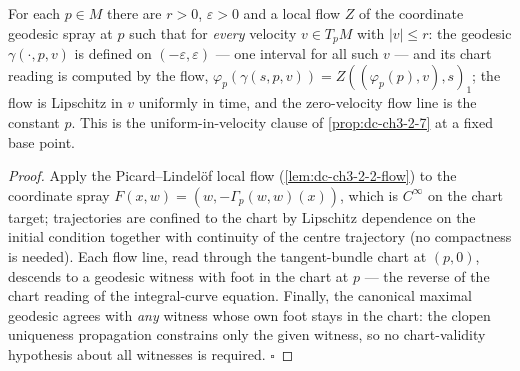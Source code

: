\begin{lemma}
  \label{lem:dc-ch3-2-7-vuniform}
  \leanok
  For each $p \in M$ there are $r > 0$, $\varepsilon > 0$ and a local flow $Z$
  of the coordinate geodesic spray at $p$ such that for \emph{every} velocity
  $v \in T_pM$ with $|v| \le r$: the geodesic $\gamma(\cdot, p, v)$ is defined
  on $(-\varepsilon, \varepsilon)$ — one interval for all such $v$ — and its
  chart reading is computed by the flow,
  $\varphi_p(\gamma(s, p, v)) = Z((\varphi_p(p), v), s)_1$; the flow is
  Lipschitz in $v$ uniformly in time, and the zero-velocity flow line is the
  constant $p$. This is the uniform-in-velocity clause of
  \cref{prop:dc-ch3-2-7} at a fixed base point.
\end{lemma}
\begin{proof}
  \leanok
  Apply the Picard--Lindelöf local flow (\cref{lem:dc-ch3-2-2-flow}) to the
  coordinate spray $F(x, w) = (w, -\Gamma_p(w, w)(x))$, which is $C^\infty$ on
  the chart target; trajectories are confined to the chart by Lipschitz
  dependence on the initial condition together with continuity of the centre
  trajectory (no compactness is needed). Each flow line, read through the
  tangent-bundle chart at $(p, 0)$, descends to a geodesic witness with foot in
  the chart at $p$ — the reverse of the chart reading of the integral-curve
  equation. Finally, the canonical maximal geodesic agrees with \emph{any}
  witness whose own foot stays in the chart: the clopen uniqueness propagation
  constrains only the given witness, so no chart-validity hypothesis about all
  witnesses is required. $\square$
\end{proof}

